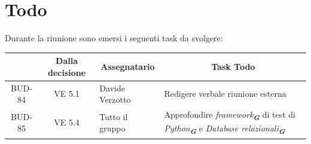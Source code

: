 

\section{Todo}

Durante la riunione sono emersi i seguenti task da svolgere:

\vspace{0.5cm}

\begin{table}[htbp]
\centering
{}
\begin{tabular}{|c|c|p{}|p{}|}
    \hline
    \rowcolor[gray]{0.75}
    \multicolumn{1}{|c|}{\textbf{Codice}} & \multicolumn{1}{|c|}{\textbf{Dalla decisione}} & \multicolumn{1}{|c|}{\textbf{Assegnatario}} & \multicolumn{1}{|c|}{\textbf{Task Todo}} \\
    \hline
    BUD-84 & VE 5.1 & Davide Verzotto & Redigere verbale riunione esterna \\
    BUD-85 & VE 5.4 & Tutto il gruppo & Approfondire \emph{framework}\textsubscript{\textbf{\textit{G}}} di test di \emph{Python}\textsubscript{\textbf{\textit{G}}} e \emph{Database relazionali}\textsubscript{\textbf{\textit{G}}}\\
    \hline
\end{tabular}
\end{table}


